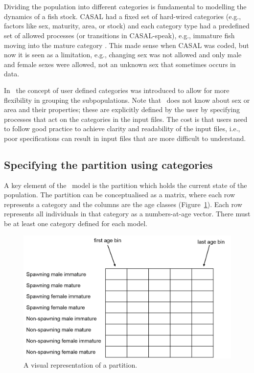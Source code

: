 \section{\label{sec:PartitionCategories}}

Dividing the population into different categories is fundamental to modelling the dynamics of a fish stock. CASAL had a fixed set of hard-wired categories (e.g., factors like sex, maturity, area, or stock) and each category type had a predefined set of allowed processes (or transitions in CASAL-speak), e.g., immature fish moving into the mature category \citep{1388}. This made sense when CASAL was coded, but now it is seen as a limitation, e.g., changing sex was not allowed and only male and female sexes were allowed, not an unknown sex that sometimes occurs in data. 

In \CNAME\, the concept of user defined categories was introduced to allow for more flexibility in grouping the subpopulations. Note that \CNAME\ does not know about sex or area and their properties; these are explicitly defined by the user by specifying processes that act on the categories in the input files. The cost is that users need to follow good practice to achieve clarity and readability of the input files, i.e., poor specifications can result in input files that are more difficult to understand.

\subsection{Specifying the partition using categories}

A key element of the \CNAME\ model is the partition which holds the current state of the population. The partition can be conceptualised as a matrix, where each row represents a category and the columns are the age classes (Figure~\ref{Fig:part}). Each row represents all individuals in that category as a numbers-at-age vector.  There must be at least one category defined for each model.

\begin{figure}[H]
	\centering
	\includegraphics[scale=0.4]{Figures/partition2.png}
		\caption{A visual representation of a partition.}\label{Fig:part}
\end{figure}

